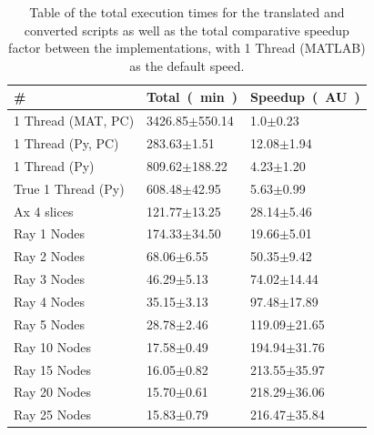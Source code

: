 \documentclass[12pt, a4paper]{article}
\begin{document}
\begin{table}[H]
    \centering
    \caption{Table of the total execution times for the translated and converted scripts as well as the total comparative speedup factor between the implementations, with 1 Thread (MATLAB) as the default speed.}
    \begin{tabular}{|l|l|l|}
    \hline
    \#                 & \SI[parse-numbers=false]{Total}{(\minute)}        & \SI[parse-numbers=false]{Speedup}{(AU)}       \\ \hline
    1 Thread (MAT, PC) & 3426.85$\pm$550.14 & 1.0$\pm$0.23     \\ 
    1 Thread (Py, PC)  & 283.63$\pm$1.51    & 12.08$\pm$1.94   \\ 
    1 Thread (Py)      & 809.62$\pm$188.22  & 4.23$\pm$1.20    \\ 
    True 1 Thread (Py) & 608.48$\pm$42.95   & 5.63$\pm$0.99    \\ 
    Ax 4 slices        & 121.77$\pm$13.25   & 28.14$\pm$5.46   \\ 
    Ray 1 Nodes        & 174.33$\pm$34.50   & 19.66$\pm$5.01   \\ 
    Ray 2 Nodes        & 68.06$\pm$6.55     & 50.35$\pm$9.42   \\ 
    Ray 3 Nodes        & 46.29$\pm$5.13     & 74.02$\pm$14.44  \\ 
    Ray 4 Nodes        & 35.15$\pm$3.13     & 97.48$\pm$17.89  \\ 
    Ray 5 Nodes        & 28.78$\pm$2.46     & 119.09$\pm$21.65 \\ 
    Ray 10 Nodes       & 17.58$\pm$0.49     & 194.94$\pm$31.76 \\ 
    Ray 15 Nodes       & 16.05$\pm$0.82     & 213.55$\pm$35.97 \\ 
    Ray 20 Nodes       & 15.70$\pm$0.61     & 218.29$\pm$36.06 \\ 
    Ray 25 Nodes       & 15.83$\pm$0.79     & 216.47$\pm$35.84 \\ \hline
    \end{tabular}
    \label{TotTime}
\end{table}

\end{document}
